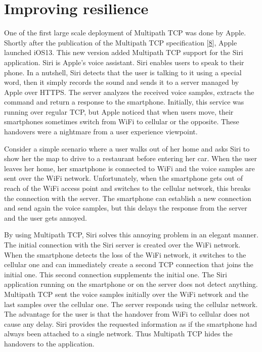 \documentclass[letterpaper,10pt,english]{sphinxmanual}
\begin{document}
\section{Improving resilience}
\label{\detokenize{usecases:improving-resilience}}
\sphinxAtStartPar
One of the first large scale deployment of Multipath TCP was done by Apple.
Shortly after the publication of the Multipath TCP specification {[}\hyperlink{cite.biblio:id6658}{8}{]}, Apple launched iOS13. This new version added Multipath TCP support for the Siri application. Siri is Apple’s voice assistant. Siri enables users to speak to their phone. In a nutshell, Siri detects that the user is talking to it using a special word, then it simply records the sound and sends it to a server managed by Apple over HTTPS. The server analyzes the received
voice samples, extracts the command and return a response to the smartphone. Initially, this service was running over regular TCP, but Apple noticed that
when users move, their smartphones sometimes switch from Wi\sphinxhyphen{}Fi to cellular or the opposite. These handovers were a nightmare from a user experience viewpoint.

\sphinxAtStartPar
Consider a simple scenario where a user walks out of her home and asks Siri to show her the map to drive to a restaurant before entering her car. When the user
leaves her home, her smartphone is connected to Wi\sphinxhyphen{}Fi and the voice samples are sent over the Wi\sphinxhyphen{}Fi network. Unfortunately, when the smartphone gets out of reach of the Wi\sphinxhyphen{}Fi access point and switches to the cellular network, this breaks the connection with the server. The smartphone can establish a new connection and send again the voice samples, but this delays the response from the server and the user gets annoyed.

\sphinxAtStartPar
By using Multipath TCP, Siri solves this annoying problem in an elegant manner. The initial connection with the Siri server is created over the Wi\sphinxhyphen{}Fi network. When the smartphone detects the loss of the Wi\sphinxhyphen{}Fi network, it switches to the cellular one and can immediately create a second TCP connection that joins the initial one. This second connection supplements the initial one. The Siri application running on the smartphone or on the server does not detect anything. Multipath TCP sent the voice samples initially over the Wi\sphinxhyphen{}Fi network and the last samples over the cellular one. The server responds using the cellular network. The advantage for the user is that the handover from Wi\sphinxhyphen{}Fi to cellular does not cause any delay. Siri provides the requested information as if the smartphone had always been attached to a single network. Thus Multipath TCP hides the handovers to the application.
\end{document}

